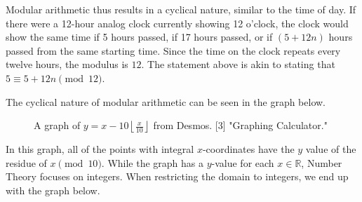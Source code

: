 \documentclass{article}
\begin{document}
Modular arithmetic thus results in a cyclical nature, similar to the time of day. If there were a 12-hour analog clock currently showing 12 o'clock, the clock would show the same time if 5 hours passed, if 17 hours passed, or if $(5+12n)$ hours passed from the same starting time. Since the time on the clock repeats every twelve hours, the modulus is $12$. The statement above is akin to stating that $5 \equiv 5+12n \pmod {12}$.

The cyclical nature of modular arithmetic can be seen in the graph below.
\begin{figure}[H]
    \centering
    \caption{A graph of $y=x-10\left\lfloor \frac{x}{10}\right\rfloor$ from Desmos. [3] "Graphing Calculator."}
\end{figure}
In this graph, all of the points with integral $x$-coordinates have the $y$ value of the residue of $x \pmod {10}$. While the graph has a $y$-value for each $x \in \mathbb{R}$, Number Theory focuses on integers. When restricting the domain to integers, we end up with the graph below.
\end{document}
